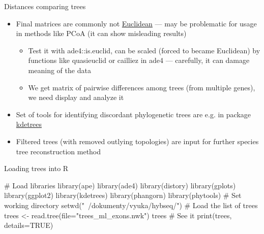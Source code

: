 \documentclass[compress, ucs, xelatex, 11pt, xcolor=x11names, aspectratio=169,
	hyperref={
		bookmarks=true,
		unicode=true,
		colorlinks=true,
		pdftitle={HybSeq course},
		plainpages=false,
		pdfauthor={Vojtech Zeisek},
		pdfsubject={Practical processing of HybSeq target enrichment sequencing data on computing grids like MetaCentrum},
		pdfcreator={XeLaTeX},
		pdfkeywords={BASH, command line, GNU, HybSeq, Linux, MetaCentrum, sequencing shell, target enrichment},
		linkcolor=Turquoise4, %
		anchorcolor=DodgerBlue4, %
		citecolor=DodgerBlue4, %
		filecolor=DodgerBlue4, %
		menucolor=Tan4, %
		urlcolor=DarkOliveGreen4, %
		pdftex},
	url={hyphens, lowtilde} %
	]{beamer}
\renewcommand{\texttt}[1]{\colorbox{Cornsilk2}{{\ttfamily #1}}}
\begin{document}
\begin{frame}[allowframebreaks]{Distances comparing trees}
\begin{itemize}
\begin{itemize}
			\item Final matrices are commonly not \href{https://en.wikipedia.org/wiki/Euclidean_distance_matrix}{Euclidean} --- may be problematic for usage in methods like PCoA (it can show misleading results)
			\begin{itemize}
				\item Test it with \texttt{ade4::is.euclid}, can be scaled (forced to became Euclidean) by functions like \texttt{quasieuclid} or \texttt{cailliez} in \texttt{ade4} --- carefully, it can damage meaning of the data
				\item We get matrix of pairwise differences among trees (from multiple genes), we need display and analyze it
			\end{itemize}
			\item Set of tools for identifying discordant phylogenetic trees are e.g. in package \href{https://CRAN.R-project.org/package=kdetrees}{kdetrees}
			\item Filtered trees (with removed outlying topologies) are input for further species tree reconstruction method
		\end{itemize}
	\end{itemize}
\end{frame}


\begin{frame}[fragile]{Loading trees into R}
	\begin{spluscode}
    # Load libraries
    library(ape)
    library(ade4)
    library(distory)
    library(gplots)
    library(ggplot2)
    library(kdetrees)
    library(phangorn)
    library(phytools)
    # Set working directory
    setwd("~/dokumenty/vyuka/hybseq/")
    # Load the list of trees
    trees <- read.tree(file="trees_ml_exons.nwk")
    trees # See it
    print(trees, details=TRUE)
	\end{spluscode}
\end{frame}
\end{document}
